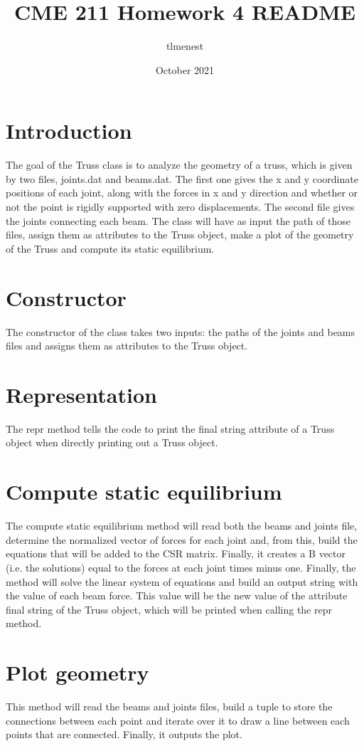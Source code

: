 \documentclass{article}
\title{CME 211 Homework 4 README}
\author{tlmenest }
\date{October 2021}
\begin{document}
\maketitle

\section{Introduction}

The goal of the Truss class is to analyze the geometry of a truss, which is 
given by two files, joints.dat and beams.dat. The first one gives the x and y coordinate positions of each joint, along with the forces in x and y direction and whether or not the point is rigidly supported with zero displacements. The second file gives the joints connecting each beam. The class will have as input the path of those files, assign them as attributes to the Truss object, make a plot of the geometry of the Truss and compute its static equilibrium.

\section{Constructor}

The constructor of the class takes two inputs: the paths of the joints and beams files and assigns them as attributes to the Truss object.

\section{Representation}

The repr method tells the code to print the final string attribute of a Truss object when directly printing out a Truss object.

\section{Compute static equilibrium}

The compute static equilibrium method will read both the beams and joints file, determine the normalized vector of forces for each joint and, from this, build the equations that will be added to the CSR matrix. Finally, it creates a B vector (i.e. the solutions) equal to the forces at each joint times minus one. Finally, the method will solve the linear system of equations and build an output string with the value of each beam force. This value will be the new value of the attribute final string of the Truss object, which will be printed when calling the repr method.

\section{Plot geometry}

This method will read the beams and joints files, build a tuple to store the connections between each point and iterate over it to draw a line between each points that are connected. Finally, it outputs the plot.
\end{document}
